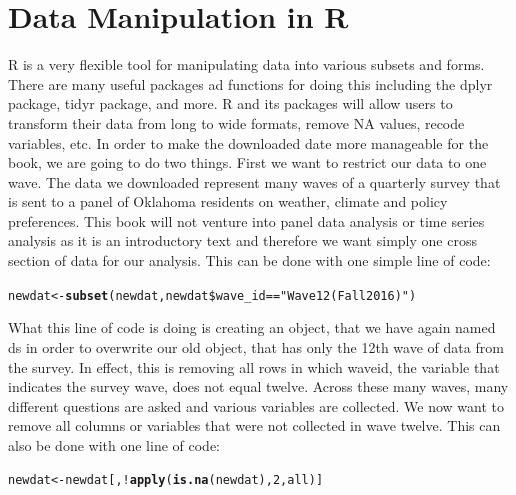 \documentclass[11pt,openany]{book}\usepackage[]{graphicx}\usepackage[]{color}
\makeatletter
\newcommand{\hlnum}[1]{\textcolor[rgb]{0.686,0.059,0.569}{#1}}%
\newcommand{\hlstr}[1]{\textcolor[rgb]{0.192,0.494,0.8}{#1}}%
\newcommand{\hlopt}[1]{\textcolor[rgb]{0,0,0}{#1}}%
\newcommand{\hlstd}[1]{\textcolor[rgb]{0.345,0.345,0.345}{#1}}%
\newcommand{\hlkwb}[1]{\textcolor[rgb]{0.69,0.353,0.396}{#1}}%
\newcommand{\hlkwd}[1]{\textcolor[rgb]{0.737,0.353,0.396}{\textbf{#1}}}%
\newenvironment{kframe}{%
 \def\at@end@of@kframe{}%
 \ifinner\ifhmode%
  \def\at@end@of@kframe{\end{minipage}}%
  \begin{minipage}{\columnwidth}%
 \fi\fi%
 \def\FrameCommand##1{\hskip\@totalleftmargin \hskip-\fboxsep
 \colorbox{shadecolor}{##1}\hskip-\fboxsep
     \hskip-\linewidth \hskip-\@totalleftmargin \hskip\columnwidth}%
 \MakeFramed {\advance\hsize-\width
   \@totalleftmargin\z@ \linewidth\hsize
   \@setminipage}}%
 {\par\unskip\endMakeFramed%
 \at@end@of@kframe}
\newenvironment{knitrout}{}{} %
\renewenvironment{knitrout}{\begin{singlespace}}{\end{singlespace}}
\makeatother
\begin{document}
\section{Data Manipulation in R}

R is a very flexible tool for manipulating data into various subsets and forms. There are many useful packages ad functions for doing this including the dplyr package, tidyr package, and more. R and its packages will allow users to transform their data from long to wide formats, remove NA values, recode variables, etc. In order to make the downloaded date more manageable for the book, we are going to do two things. First we want to restrict our data to one wave. The data we downloaded represent many waves of a quarterly survey that is sent to a panel of Oklahoma residents on weather, climate and policy preferences. This book will not venture into panel data analysis or time series analysis as it is an introductory text and therefore we want simply one cross section of data for our analysis. This can be done with one simple line of code:

\begin{knitrout}
\color{fgcolor}\begin{kframe}
\begin{alltt}
\hlstd{newdat} \hlkwb{<-} \hlkwd{subset}\hlstd{(newdat, newdat}\hlopt{\$}\hlstd{wave_id} \hlopt{==} \hlstr{"Wave 12 (Fall 2016)"}\hlstd{)}
\end{alltt}
\end{kframe}
\end{knitrout}

What this line of code is doing is creating an object, that we have again named ds in order to overwrite our old object, that has only the 12th wave of data from the survey. In effect, this is removing all rows in which waveid, the variable that indicates the survey wave, does not equal twelve. Across these many waves, many different questions are asked and various variables are collected. We now want to remove all columns or variables that were not collected in wave twelve. This can also be done with one line of code:

\begin{knitrout}
\color{fgcolor}\begin{kframe}
\begin{alltt}
\hlstd{newdat} \hlkwb{<-} \hlstd{newdat[,} \hlopt{!}\hlkwd{apply}\hlstd{(}\hlkwd{is.na}\hlstd{(newdat),} \hlnum{2}\hlstd{, all)]}
\end{alltt}
\end{kframe}
\end{knitrout}
\end{document}
